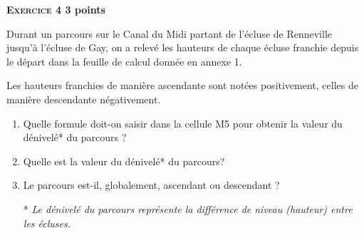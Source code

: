 \textbf{\textsc{Exercice 4} \hfill 3 points}

\medskip

Durant un parcours sur le Canal du Midi partant de l'écluse de Renneville jusqu'à l'écluse de Gay, on a relevé les hauteurs de chaque écluse franchie depuis le départ dans la feuille de calcul donnée en annexe 1.
 
Les hauteurs franchies de manière ascendante sont notées positivement, celles de manière descendante négativement.

\medskip
 
\begin{enumerate}
\item Quelle formule doit-on saisir dans la cellule M5 pour obtenir la valeur du dénivelé* du parcours ? 
\item Quelle est la valeur du dénivelé* du parcours? 
\item Le parcours est-il, globalement, ascendant ou descendant ?
 
* \emph{Le dénivelé du parcours représente la différence de niveau (hauteur) entre les écluses.}
\end{enumerate}
 
\vspace{0,5cm}

